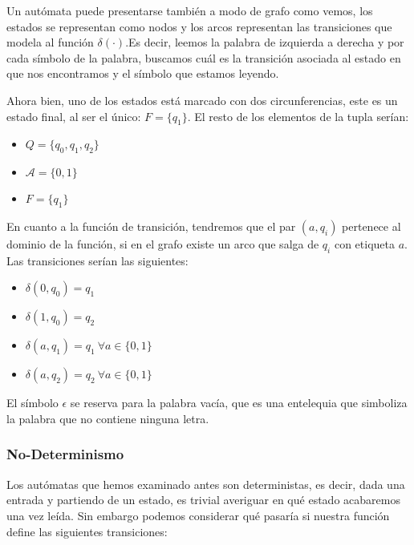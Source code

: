 Un autómata puede presentarse también a modo de grafo como vemos, los estados se representan como nodos y los arcos representan las transiciones que modela al función $\delta(\cdot)$.Es decir, leemos la palabra de izquierda a derecha y por cada símbolo de la palabra, buscamos cuál es la transición asociada al estado en que nos encontramos y el símbolo que estamos leyendo.

Ahora bien, uno de los estados está marcado con dos circunferencias, este es un estado final, al ser el único: $F = \{q_1\}$. El resto de los elementos de la tupla serían:

\begin{multicols}{2}
	\begin{itemize}
		\item $Q =\{q_0,q_1,q_2\}$
		\item $\mathcal{A} = \{0,1\}$
		\item $F = \{q_1\}$
	\end{itemize}
	
\end{multicols}

En cuanto a la función de transición, tendremos que el par $(a,q_i)$ pertenece al dominio de la función, si en el grafo existe un arco que salga de $q_i$ con etiqueta $a$. Las transiciones serían las siguientes:

\begin{multicols}{2}
	\begin{itemize}
		\item $\delta(0,q_0)=q_1$
		\item $\delta(1,q_0)=q_2$
		\item $\delta(a,q_1)=q_1 \ \forall a \in \{0,1\}$
		\item $\delta(a,q_2)=q_2 \ \forall a \in \{0,1\}$
	\end{itemize}
\end{multicols}

El símbolo $\epsilon$ se reserva para la palabra vacía, que es una entelequia que simboliza la palabra que no contiene ninguna letra.





\subsubsection{No-Determinismo}

Los autómatas que hemos examinado antes son deterministas, es decir, dada una entrada y partiendo de un estado, es trivial averiguar en qué estado acabaremos una vez leída. Sin embargo podemos considerar qué pasaría si nuestra función define las siguientes transiciones:

